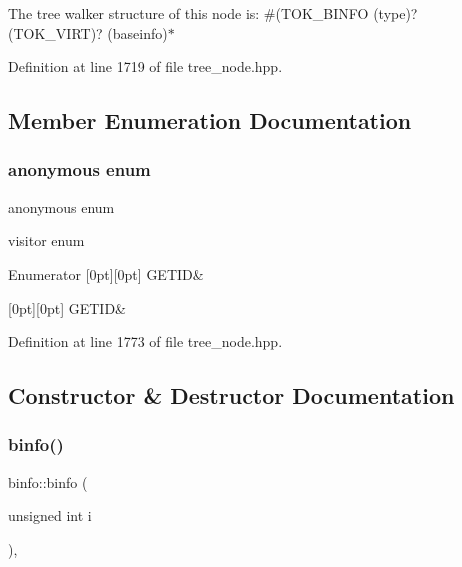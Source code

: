 The tree walker structure of this node is\+: \#(T\+O\+K\+\_\+\+B\+I\+N\+FO (type)? (T\+O\+K\+\_\+\+V\+I\+RT)? (baseinfo)$\ast$ 

Definition at line 1719 of file tree\+\_\+node.\+hpp.



\subsection{Member Enumeration Documentation}
\mbox{\label{structbinfo_aa40aecb0c52ec4b75f6a5abd614be31b}} 
\subsubsection{\texorpdfstring{anonymous enum}{anonymous enum}}
{\footnotesize\ttfamily anonymous enum}



visitor enum 

\begin{DoxyEnumFields}{Enumerator}
[0pt][0pt]{}\mbox{\label{structbinfo_aa40aecb0c52ec4b75f6a5abd614be31ba6ee51740d097757eed67fd70f06015f8}} 
G\+E\+T\+ID&\\
\hline

[0pt][0pt]{}\mbox{\label{structbinfo_aa40aecb0c52ec4b75f6a5abd614be31ba6ee51740d097757eed67fd70f06015f8}} 
G\+E\+T\+ID&\\
\hline

\end{DoxyEnumFields}


Definition at line 1773 of file tree\+\_\+node.\+hpp.



\subsection{Constructor \& Destructor Documentation}
\mbox{\label{structbinfo_a76ec269ad6525a9f2d6015973c1ee6c7}} 
\subsubsection{\texorpdfstring{binfo()}{binfo()}}
{\footnotesize\ttfamily binfo\+::binfo (\begin{DoxyParamCaption}\item[{unsigned int}]{i }\end{DoxyParamCaption})\hspace{0.3cm}{\ttfamily [inline]}, {\ttfamily [explicit]}}



